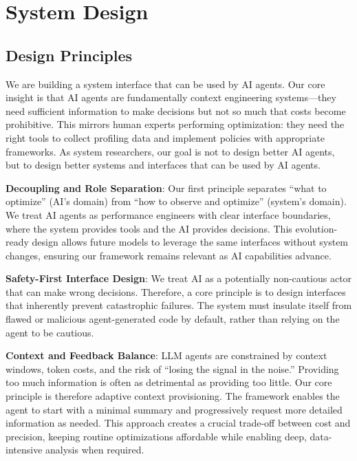 \section{System Design}
\label{sec:design}

\subsection{Design Principles}

We are building a system interface that can be used by AI agents. Our core insight is that AI agents are fundamentally context engineering systems—they need sufficient information to make decisions but not so much that costs become prohibitive. This mirrors human experts performing optimization: they need the right tools to collect profiling data and implement policies with appropriate frameworks. As system researchers, our goal is not to design better AI agents, but to design better systems and interfaces that can be used by AI agents.

\textbf{Decoupling and Role Separation}: Our first principle separates ``what to optimize'' (AI's domain) from ``how to observe and optimize'' (system's domain). We treat AI agents as performance engineers with clear interface boundaries, where the system provides tools and the AI provides decisions. This evolution-ready design allows future models to leverage the same interfaces without system changes, ensuring our framework remains relevant as AI capabilities advance.

\textbf{Safety-First Interface Design}: We treat AI as a potentially non-cautious actor that can make wrong decisions. Therefore, a core principle is to design interfaces that inherently prevent catastrophic failures. The system must insulate itself from flawed or malicious agent-generated code by default, rather than relying on the agent to be cautious.

\textbf{Context and Feedback Balance}: LLM agents are constrained by context windows, token costs, and the risk of ``losing the signal in the noise.'' Providing too much information is often as detrimental as providing too little. Our core principle is therefore adaptive context provisioning. The framework enables the agent to start with a minimal summary and progressively request more detailed information as needed. This approach creates a crucial trade-off between cost and precision, keeping routine optimizations affordable while enabling deep, data-intensive analysis when required.

